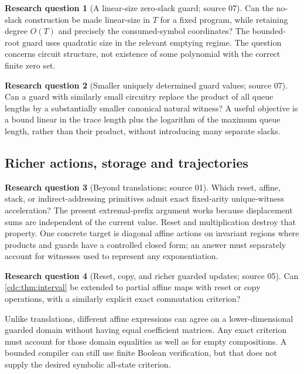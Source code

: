 \documentclass[11pt,a4paper]{article}
\theoremstyle{definition}
\newtheorem{question}[question]{Research question}
\theoremstyle{remark}
\begin{document}
\begin{question}[A linear-size zero-slack guard; source 07]
Can the no-slack construction be made linear-size in $T$ for a fixed program, while retaining degree $O(T)$ and precisely the consumed-symbol coordinates? The bounded-root guard uses quadratic size in the relevant emptying regime. The question concerns circuit structure, not existence of some polynomial with the correct finite zero set.
\end{question}

\begin{question}[Smaller uniquely determined guard values; source 07]
Can a guard with similarly small circuitry replace the product of all queue lengths by a substantially smaller canonical natural witness? A useful objective is a bound linear in the trace length plus the logarithm of the maximum queue length, rather than their product, without introducing many separate slacks.
\end{question}

\subsection{Richer actions, storage and trajectories}

\begin{question}[Beyond translations; source 01]
Which reset, affine, stack, or indirect-addressing primitives admit exact fixed-arity unique-witness acceleration? The present extremal-prefix argument works because displacement sums are independent of the current value. Reset and multiplication destroy that property. One concrete target is diagonal affine actions on invariant regions where products and guards have a controlled closed form; an answer must separately account for witnesses used to represent any exponentiation.
\end{question}

\begin{question}[Reset, copy, and richer guarded updates; source 05]
Can \cref{cdc:thm:interval} be extended to partial affine maps with reset or copy operations, with a similarly explicit exact commutation criterion?
\end{question}
Unlike translations, different affine expressions can agree on a lower-dimensional guarded domain without having equal coefficient matrices. Any exact criterion must account for those domain equalities as well as for empty compositions. A bounded compiler can still use finite Boolean verification, but that does not supply the desired symbolic all-state criterion.
\end{document}
